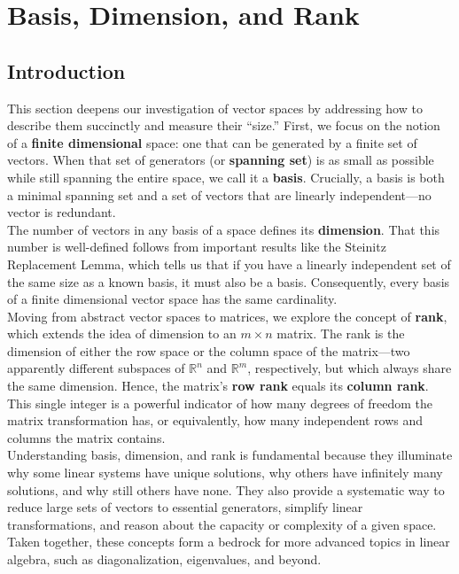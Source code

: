 \documentclass[a4paper, 9pt]{extarticle}
\begin{document}
\section{Basis, Dimension, and Rank}
\subsection*{Introduction}
This section deepens our investigation of vector spaces by addressing how to describe them succinctly and measure their “size.” First, we focus on the notion of a \textbf{finite dimensional} space: one that can be generated by a finite set of vectors. When that set of generators (or \textbf{spanning set}) is as small as possible while still spanning the entire space, we call it a \textbf{basis}. Crucially, a basis is both a minimal spanning set and a set of vectors that are linearly independent—no vector is redundant. \\[2ex]
\noindent The number of vectors in any basis of a space defines its \textbf{dimension}. That this number is well-defined follows from important results like the Steinitz Replacement Lemma, which tells us that if you have a linearly independent set of the same size as a known basis, it must also be a basis. Consequently, every basis of a finite dimensional vector space has the same cardinality. \\[2ex]
\noindent Moving from abstract vector spaces to matrices, we explore the concept of \textbf{rank}, which extends the idea of dimension to an $m\times n$ matrix. The rank is the dimension of either the row space or the column space of the matrix—two apparently different subspaces of $\mathbb{R}^n$ and $\mathbb{R}^m$, respectively, but which always share the same dimension. Hence, the matrix’s \textbf{row rank} equals its \textbf{column rank}. This single integer is a powerful indicator of how many degrees of freedom the matrix transformation has, or equivalently, how many independent rows and columns the matrix contains. \\[2ex]
\noindent Understanding basis, dimension, and rank is fundamental because they illuminate why some linear systems have unique solutions, why others have infinitely many solutions, and why still others have none. They also provide a systematic way to reduce large sets of vectors to essential generators, simplify linear transformations, and reason about the capacity or complexity of a given space. Taken together, these concepts form a bedrock for more advanced topics in linear algebra, such as diagonalization, eigenvalues, and beyond.\\[2ex]
\end{document}
